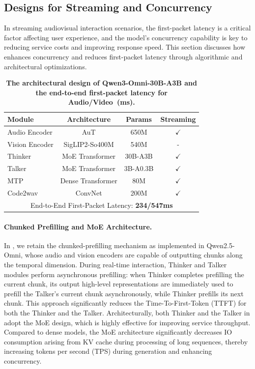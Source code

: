 \subsection{Designs for Streaming and Concurrency}
In streaming audiovisual interaction scenarios, the first-packet latency is a critical factor affecting user experience, and the model's concurrency capability is key to reducing service costs and improving response speed. This section discusses how \method enhances concurrency and reduces first-packet latency through algorithmic and architectural optimizations.

\begin{table}[htbp]
\centering
\caption{\textbf{The architectural design of Qwen3-Omni-30B-A3B and the end-to-end first-packet latency for Audio/Video~(ms).}}
\vspace{-1mm}
\begin{tabular}{lccc}
\toprule
\textbf{Module}         & \textbf{Architecture}      & \textbf{Params}    & \textbf{Streaming} \\\midrule
Audio Encoder  & AuT               & 650M      & $\checkmark$        \\
Vision Encoder & SigLIP2-So400M    & 540M     & -        \\
Thinker        & MoE Transformer   & 30B-A3B  & $\checkmark$        \\
Talker         & MoE Transformer   & 3B-A0.3B & $\checkmark$        \\
MTP            & Dense Transformer & 80M     & $\checkmark$        \\
Code2wav       & ConvNet           & 200M     & $\checkmark$        \\\midrule
\multicolumn{4}{c}{End-to-End First-Packet Latency: \textbf{234/547ms}} \\
\bottomrule
\end{tabular}
\end{table}


\paragraph{Chunked Prefilling and MoE Architecture.} In \method, we retain the chunked-prefilling mechanism as implemented in Qwen2.5-Omni, whose audio and vision encoders are capable of outputting chunks along the temporal dimension. During real-time interaction, Thinker and Talker modules perform asynchronous prefilling: when Thinker completes prefilling the current chunk, its output high-level representations are immediately used to prefill the Talker’s current chunk asynchronously, while Thinker prefills its next chunk. This approach significantly reduces the Time-To-First-Token (TTFT) for both the Thinker and the Talker. Architecturally, both Thinker and the Talker in \method adopt the MoE design, which is highly effective for improving service throughput. Compared to dense models, the MoE architecture significantly decreases IO consumption arising from KV cache during processing of long sequences, thereby increasing tokens per second (TPS) during generation and enhancing concurrency.

